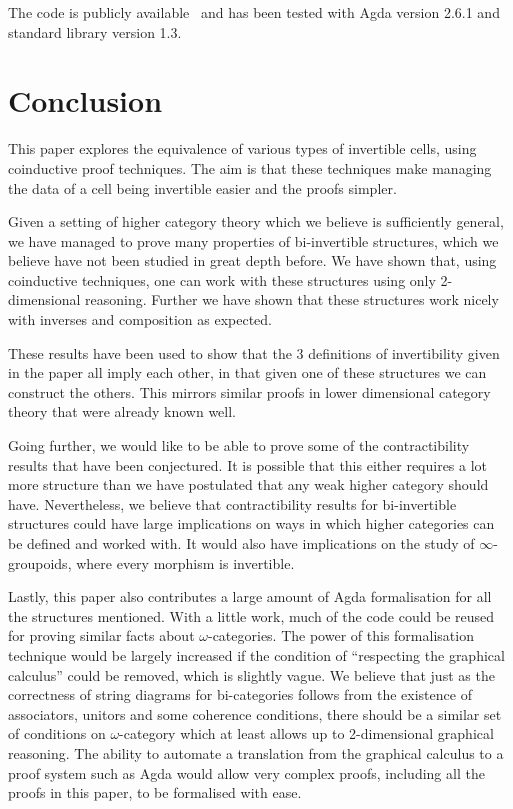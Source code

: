 \documentclass[draft]{article}
\begin{document}
The code is publicly available~\cite{rice_agda} and has been tested
with Agda version 2.6.1 and standard library version
1.3.

\section{Conclusion}\label{sec:conclusion}

This paper explores the equivalence of various types of invertible
cells, using coinductive proof techniques. The aim is that these
techniques make managing the data of a cell being invertible easier
and the proofs simpler.

Given a setting of higher category theory which we believe is
sufficiently general, we have managed to prove many properties of
bi-invertible structures, which we believe have not been studied in
great depth before. We have shown that, using coinductive techniques,
one can work with these structures using only 2-dimensional reasoning.
Further we have shown that these structures work nicely with inverses
and composition as expected.

These results have been used to show that the 3 definitions of
invertibility given in the paper all imply each other, in that given
one of these structures we can construct the others. This mirrors
similar proofs in lower dimensional category theory that were already
known well.

Going further, we would like to be able to prove some of the
contractibility results that have been conjectured. It is possible
that this either requires a lot more structure than we have postulated
that any weak higher category should have. Nevertheless, we believe
that contractibility results for bi-invertible structures could have
large implications on ways in which higher categories can be defined
and worked with. It would also have implications on the study of
\(\infty\)-groupoids, where every morphism is invertible.

Lastly, this paper also contributes a large amount of Agda
formalisation for all the structures mentioned. With a little work,
much of the code could be reused for proving similar facts about
\(\omega\)-categories. The power of this formalisation technique would
be largely increased if the condition of ``respecting the graphical
calculus'' could be removed, which is slightly vague. We believe that
just as the correctness of string diagrams for bi-categories follows
from the existence of associators, unitors and some coherence
conditions, there should be a similar set of conditions on
\(\omega\)-category which at least allows up to 2-dimensional
graphical reasoning. The ability to automate a translation from the
graphical calculus to a proof system such as Agda would allow very
complex proofs, including all the proofs in this paper, to be
formalised with ease.

\printbibliography{}
\end{document}
